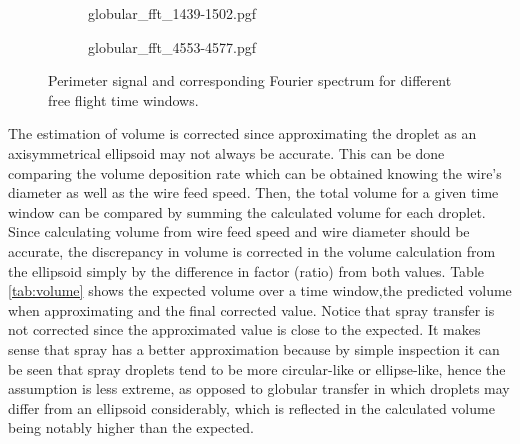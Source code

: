 \begin{figure}
\centering
    \ContinuedFloat
    \captionsetup{list=off,format=cont}
  \begin{subfigure}[b]{\textwidth}
    {globular_fft_1439-1502.pgf}
  \end{subfigure}
\vfill
  \begin{subfigure}[b]{\textwidth}
    {globular_fft_4553-4577.pgf}
  \end{subfigure}
\caption[Perimeter signal and corresponding Fourier spectrum for different free flight time windows]{Perimeter signal and corresponding Fourier spectrum for different free flight time windows.}
\end{figure}

The estimation of volume is corrected since approximating the droplet as an axisymmetrical ellipsoid may not always be accurate. This can be done comparing the volume deposition rate which can be obtained knowing the wire's diameter as well as the wire feed speed. Then, the total volume for a given time window can be compared by summing the calculated volume for each droplet. Since calculating volume from wire feed speed and wire diameter should be accurate, the discrepancy in volume is corrected in the volume calculation from the ellipsoid simply by the difference in factor (ratio) from both values. Table \ref{tab:volume} shows the expected volume over a time window,the predicted volume when approximating and the final corrected value. Notice that spray transfer is not corrected since the approximated value is close to the expected. It makes sense that spray has a better approximation because by simple inspection it can be seen that spray droplets tend to be more circular-like or ellipse-like, hence the assumption is less extreme, as opposed to globular transfer in which droplets may differ from an ellipsoid considerably, which is reflected in the calculated volume being notably higher than the expected.

